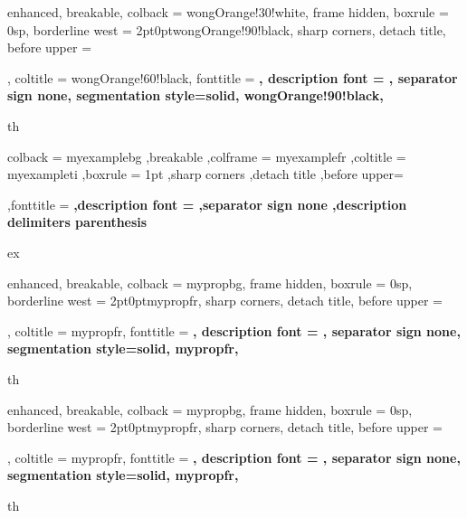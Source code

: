 {%
	enhanced,
	breakable,
	colback = wongOrange!30!white,
	frame hidden,
	boxrule = 0sp,
	borderline west = {2pt}{0pt}{wongOrange!90!black},
	sharp corners,
	detach title,
	before upper = \tcbtitle\par\smallskip,
	coltitle = wongOrange!60!black,
	fonttitle = \bfseries\sffamily,
	description font = \mdseries,
	separator sign none,
	segmentation style={solid, wongOrange!90!black},
}
{th}


{%
	colback = myexamplebg
	,breakable
	,colframe = myexamplefr
	,coltitle = myexampleti
	,boxrule = 1pt
	,sharp corners
	,detach title
	,before upper=\tcbtitle\par\smallskip
	,fonttitle = \bfseries
	,description font = \mdseries
	,separator sign none
	,description delimiters parenthesis
}
{ex}



{%
	enhanced,
	breakable,
	colback = mypropbg,
	frame hidden,
	boxrule = 0sp,
	borderline west = {2pt}{0pt}{mypropfr},
	sharp corners,
	detach title,
	before upper = \tcbtitle\par\smallskip,
	coltitle = mypropfr,
	fonttitle = \bfseries\sffamily,
	description font = \mdseries,
	separator sign none,
	segmentation style={solid, mypropfr},
}
{th}

{%
	enhanced,
	breakable,
	colback = mypropbg,
	frame hidden,
	boxrule = 0sp,
	borderline west = {2pt}{0pt}{mypropfr},
	sharp corners,
	detach title,
	before upper = \tcbtitle\par\smallskip,
	coltitle = mypropfr,
	fonttitle = \bfseries\sffamily,
	description font = \mdseries,
	separator sign none,
	segmentation style={solid, mypropfr},
}
{th}


\newcommand*{\imag}{\mathrm{i}}


\newcommand{\bbA}{\mathbb{A}}	\newcommand{\bbB}{\mathbb{B}}
\newcommand{\bbC}{\mathbb{C}}	\newcommand{\bbD}{\mathbb{D}}
\newcommand{\bbE}{\mathbb{E}}	\newcommand{\bbF}{\mathbb{F}}
\newcommand{\bbG}{\mathbb{G}}	\newcommand{\bbH}{\mathbb{H}}
\newcommand{\bbI}{\mathbb{I}}	\newcommand{\bbJ}{\mathbb{J}}
\newcommand{\bbK}{\mathbb{K}}	\newcommand{\bbL}{\mathbb{L}}
\newcommand{\bbM}{\mathbb{M}}	\newcommand{\bbN}{\mathbb{N}}
\newcommand{\bbO}{\mathbb{O}}	\newcommand{\bbP}{\mathbb{P}}
\newcommand{\bbQ}{\mathbb{Q}}	\newcommand{\bbR}{\mathbb{R}}
\newcommand{\bbS}{\mathbb{S}}	\newcommand{\bbT}{\mathbb{T}}
\newcommand{\bbU}{\mathbb{U}}	\newcommand{\bbV}{\mathbb{V}}
\newcommand{\bbW}{\mathbb{W}}	\newcommand{\bbX}{\mathbb{X}}
\newcommand{\bbY}{\mathbb{Y}}	\newcommand{\bbZ}{\mathbb{Z}}

